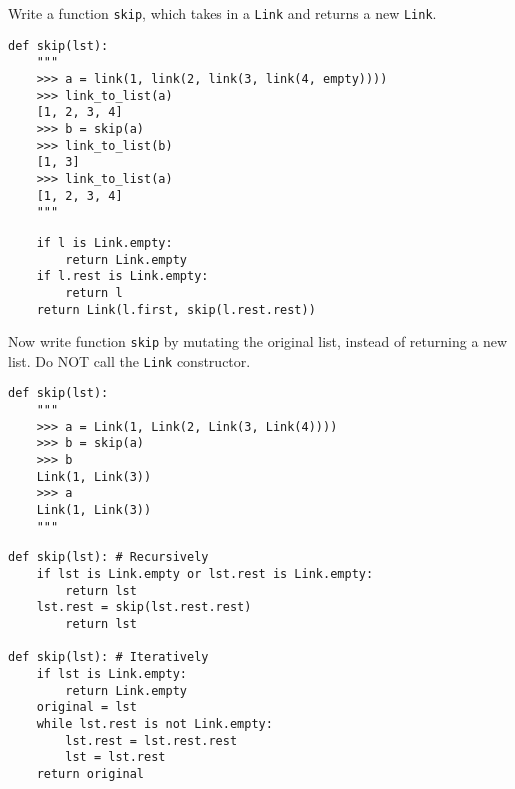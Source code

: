 \documentclass{exam}
\begin{document}
\begin{questions}
\begin{blocksection}
\question Write a function \texttt{skip}, which takes in a \texttt{Link} and returns a new \texttt{Link}.

\begin{lstlisting}
def skip(lst):
	"""
	>>> a = link(1, link(2, link(3, link(4, empty))))
	>>> link_to_list(a)
	[1, 2, 3, 4]
	>>> b = skip(a)
	>>> link_to_list(b)
	[1, 3]
	>>> link_to_list(a)
	[1, 2, 3, 4]
	"""
\end{lstlisting}
\begin{solution}[1in]
\begin{lstlisting}
	if l is Link.empty:
		return Link.empty
	if l.rest is Link.empty:
		return l
	return Link(l.first, skip(l.rest.rest))
\end{lstlisting}
\end{solution}
\end{blocksection}


\begin{blocksection}
\question Now write function \texttt{skip} by mutating the original list, instead of returning a new list. Do NOT call the \texttt{Link} constructor.

\begin{lstlisting}
def skip(lst):
	"""
	>>> a = Link(1, Link(2, Link(3, Link(4))))
	>>> b = skip(a)
	>>> b
	Link(1, Link(3))
	>>> a
	Link(1, Link(3)) 
	"""
\end{lstlisting}

\begin{solution}[1in]
\begin{lstlisting}
def skip(lst): # Recursively
	if lst is Link.empty or lst.rest is Link.empty:        
		return lst
	lst.rest = skip(lst.rest.rest)
		return lst

def skip(lst): # Iteratively
	if lst is Link.empty:
        return Link.empty
    original = lst
    while lst.rest is not Link.empty:
        lst.rest = lst.rest.rest
        lst = lst.rest
    return original
\end{lstlisting}
\end{solution}



\end{blocksection}

\end{questions}

\end{document}
